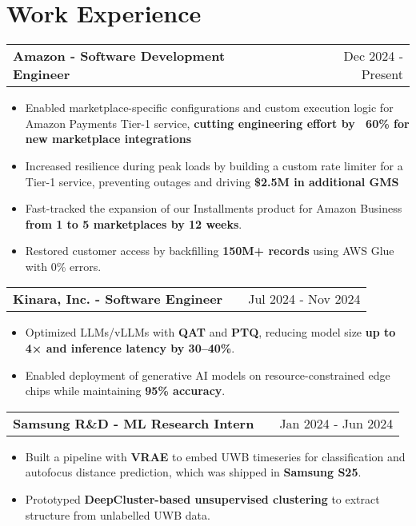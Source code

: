 \documentclass[a4paper,12pt]{article}
\makeatletter
\newenvironment{joblong}[2]
    {
    \begin{tabularx}{\linewidth}{@{}l X r@{}}
    \textbf{#1} & \hfill &  #2 \\[3.75pt]
    \end{tabularx}
    \begin{minipage}[t]{\linewidth}
    \begin{itemize}[nosep, leftmargin=1em, itemsep=1pt,label=--]
    }
    {
    \end{itemize}
    \end{minipage}    
    }
\makeatother
\begin{document}


\section{Work Experience}

\begin{joblong}{Amazon - Software Development Engineer}{Dec 2024 - Present}
\item Enabled marketplace-specific configurations and custom execution logic for Amazon Payments Tier-1 service, \textbf{cutting engineering effort by ~60\% for new marketplace integrations} 
\item Increased resilience during peak loads by building a custom rate limiter for a Tier-1 service, preventing outages and driving \textbf{\$2.5M in additional GMS}
\item Fast-tracked the expansion of our Installments product for Amazon Business \textbf{from 1 to 5 marketplaces by 12 weeks}.
\item Restored customer access by backfilling \textbf{150M+ records} using AWS Glue with 0\% errors.
\end{joblong}

\begin{joblong}{Kinara, Inc. - Software Engineer}{Jul 2024 - Nov 2024}
\item Optimized LLMs/vLLMs with \textbf{QAT} and \textbf{PTQ}, reducing model size \textbf{up to 4× and inference latency by 30–40\%}. 
\item Enabled deployment of generative AI models on resource-constrained edge chips while maintaining \textbf{95\% accuracy}.
\end{joblong}

\begin{joblong}{Samsung R\&D - ML Research Intern}{Jan 2024 - Jun 2024}
\item Built a pipeline with \textbf{VRAE} to embed UWB timeseries for classification and autofocus distance prediction, which was shipped in \textbf{Samsung S25}.
\item Prototyped \textbf{DeepCluster-based unsupervised clustering} to extract structure from unlabelled UWB data.
\end{joblong}
\end{document}
